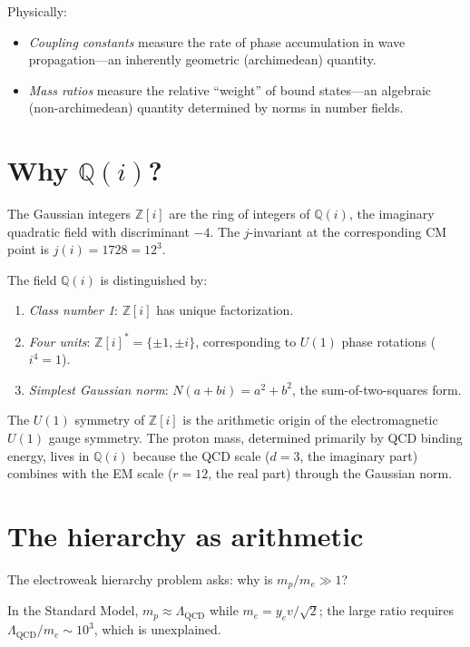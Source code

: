 \documentclass[aps,prl,twocolumn,superscriptaddress,nofootinbib]{revtex4-2}
\newcommand{\Z}{\mathbb{Z}}
\newcommand{\Q}{\mathbb{Q}}
\begin{document}
Physically:
\begin{itemize}
\item \emph{Coupling constants} measure the rate of phase
  accumulation in wave propagation---an inherently geometric
  (archimedean) quantity.
\item \emph{Mass ratios} measure the relative ``weight'' of
  bound states---an algebraic (non-archimedean) quantity
  determined by norms in number fields.
\end{itemize}

\section{Why $\Q(i)$?}

The Gaussian integers $\Z[i]$ are the ring of integers
of $\Q(i)$, the imaginary quadratic field with discriminant $-4$.
The $j$-invariant at the corresponding CM point is $j(i) = 1728 = 12^3$.

The field $\Q(i)$ is distinguished by:
\begin{enumerate}
\item \emph{Class number 1}: $\Z[i]$ has unique factorization.
\item \emph{Four units}: $\Z[i]^* = \{\pm 1, \pm i\}$,
  corresponding to $U(1)$ phase rotations ($i^4 = 1$).
\item \emph{Simplest Gaussian norm}: $N(a + bi) = a^2 + b^2$,
  the sum-of-two-squares form.
\end{enumerate}

The $U(1)$ symmetry of $\Z[i]$ is the arithmetic origin of
the electromagnetic $U(1)$ gauge symmetry.
The proton mass, determined primarily by QCD binding energy,
lives in $\Q(i)$ because the QCD scale ($d = 3$, the imaginary part)
combines with the EM scale ($r = 12$, the real part)
through the Gaussian norm.

\section{The hierarchy as arithmetic}

The electroweak hierarchy problem asks:
why is $m_p / m_e \gg 1$?

In the Standard Model, $m_p \approx \Lambda_{\mathrm{QCD}}$
while $m_e = y_e v / \sqrt{2}$; the large ratio requires
$\Lambda_{\mathrm{QCD}} / m_e \sim 10^3$, which is unexplained.
\end{document}
